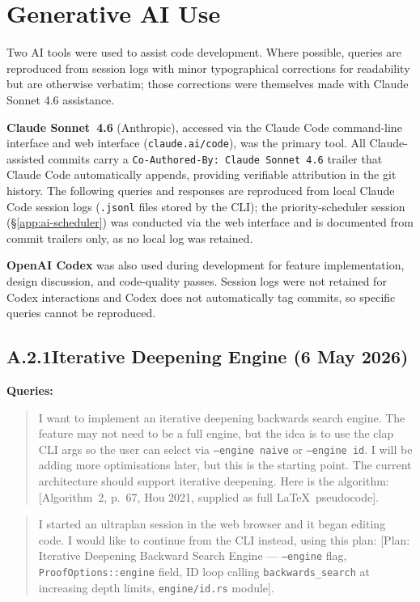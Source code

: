 \section{Generative AI Use}\label{app:ai}

Two AI tools were used to assist code development. Where possible,
queries are reproduced from session logs with minor typographical corrections
for readability but are otherwise verbatim; those corrections were themselves
made with Claude Sonnet 4.6 assistance.

\textbf{Claude Sonnet~4.6} (Anthropic), accessed via the Claude Code
command-line interface and web interface (\texttt{claude.ai/code}), was the
primary tool. All Claude-assisted commits carry a
\texttt{Co-Authored-By: Claude Sonnet~4.6} trailer that Claude Code
automatically appends, providing verifiable attribution in the git history.
The following queries and responses are reproduced from local Claude Code
session logs (\texttt{.jsonl} files stored by the CLI); the
priority-scheduler session (\S\ref{app:ai-scheduler}) was conducted via the
web interface and is documented from commit trailers only, as no local log
was retained.

\textbf{OpenAI Codex} was also used during development for feature
implementation, design discussion, and code-quality passes. Session logs were
not retained for Codex interactions and Codex does not automatically tag
commits, so specific queries cannot be reproduced.

\subsection*{A.2.1\quad Iterative Deepening Engine (6 May 2026)}

\textbf{Queries:}
\begin{quote}
  I want to implement an iterative deepening backwards search engine. The
  feature may not need to be a full engine, but the idea is to use the clap CLI
  args so the user can select via \texttt{--engine naive} or
  \texttt{--engine id}.
  I will be adding more optimisations later, but this is the starting point. The
  current architecture should support iterative deepening. Here is
  the algorithm:
  [Algorithm~2, p.~67, Hou 2021, supplied as full \LaTeX\ pseudocode].
\end{quote}

\begin{quote}
  I started an ultraplan session in the web browser and it began editing code.
  I would like to continue from the CLI instead, using this plan:
  [Plan: Iterative Deepening Backward Search Engine --- \texttt{--engine} flag,
    \texttt{ProofOptions::engine} field, ID loop calling
    \texttt{backwards\_search}
  at increasing depth limits, \texttt{engine/id.rs} module].
\end{quote}

